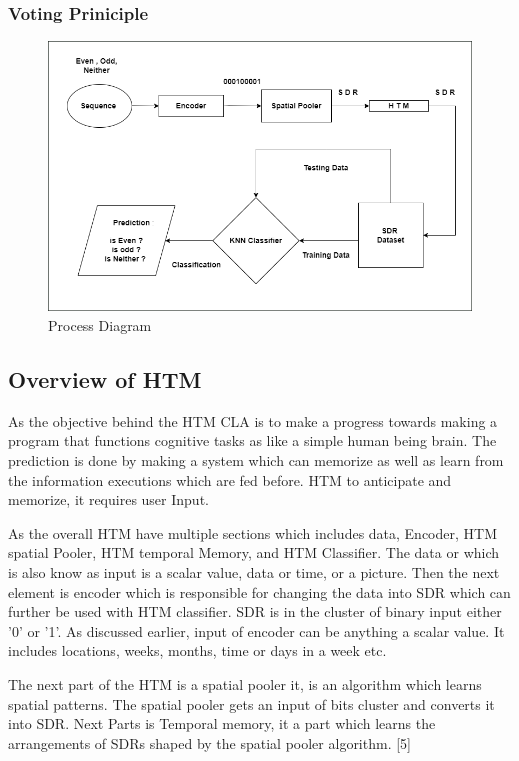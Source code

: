 \documentclass[conference]{IEEEtran}
\begin{document}
\subsubsection{Voting Priniciple}




\begin{figure}
    \centering
    \includegraphics[width=1.0\linewidth]{Process Diagram.png}
    \caption{Process Diagram}
    \label{fig:enter-label}
\end{figure}



\subsection{Overview of HTM}
As the objective behind the HTM CLA is to make a progress towards making a program that functions cognitive tasks as like a simple human being brain. The prediction is done by making a system which can memorize as well as learn from the information executions which are fed before. HTM to anticipate and memorize, it requires user Input. 

As the overall HTM have multiple sections which includes data, Encoder, HTM spatial Pooler, HTM temporal Memory, and HTM Classifier. The data or which is also know as input is a scalar value, data or time, or a picture. Then the next element is encoder which is responsible for changing the data into SDR which can further be used with HTM classifier. SDR is in the cluster of binary input either '0' or '1'. As discussed earlier, input of encoder can be anything a scalar value. It includes locations, weeks, months, time or days in a week etc. 

The next part of the HTM is a spatial pooler it, is an algorithm which learns spatial patterns. The spatial pooler gets an input of bits cluster and converts it into SDR. Next Parts is Temporal memory, it a part which learns the arrangements of SDRs shaped by the spatial pooler algorithm. [5]  
\end{document}
